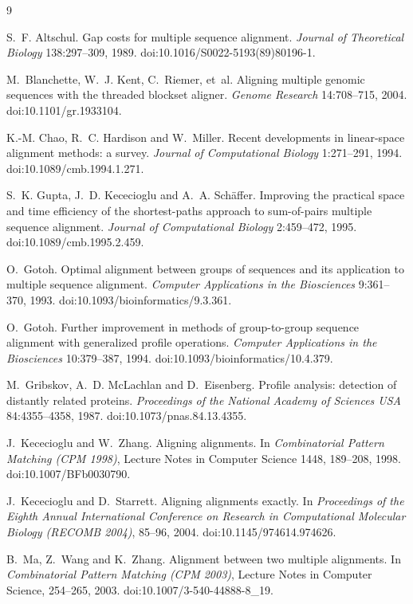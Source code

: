 \documentclass[11pt,letterpaper]{article}
\begin{document}
\begin{thebibliography}{9}

 S.~F. Altschul. Gap costs for multiple sequence alignment. \emph{Journal of Theoretical
Biology} 138:297--309, 1989. doi:10.1016/S0022-5193(89)80196-1.

 M.~Blanchette, W.~J. Kent, C.~Riemer, et~al. Aligning multiple genomic sequences with the
threaded blockset aligner. \emph{Genome Research} 14:708--715, 2004. doi:10.1101/gr.1933104.

 K.-M. Chao, R.~C. Hardison and W.~Miller. Recent developments in linear-space alignment
methods: a survey. \emph{Journal of Computational Biology} 1:271--291, 1994. doi:10.1089/cmb.1994.1.271.

 S.~K. Gupta, J.~D. Kececioglu and A.~A. Sch\"affer. Improving the practical space and time
efficiency of the shortest-paths approach to sum-of-pairs multiple sequence alignment. \emph{Journal of
Computational Biology} 2:459--472, 1995. doi:10.1089/cmb.1995.2.459.

 O.~Gotoh. Optimal alignment between groups of sequences and its application to multiple sequence
alignment. \emph{Computer Applications in the Biosciences} 9:361--370, 1993. doi:10.1093/bioinformatics/9.3.361.

 O.~Gotoh. Further improvement in methods of group-to-group sequence alignment with generalized
profile operations. \emph{Computer Applications in the Biosciences} 10:379--387, 1994.
doi:10.1093/bioinformatics/10.4.379.

 M.~Gribskov, A.~D. McLachlan and D.~Eisenberg. Profile analysis: detection of distantly
related proteins. \emph{Proceedings of the National Academy of Sciences USA} 84:4355--4358, 1987.
doi:10.1073/pnas.84.13.4355.

 J.~Kececioglu and W.~Zhang. Aligning alignments. In \emph{Combinatorial Pattern Matching
(CPM 1998)}, Lecture Notes in Computer Science 1448, 189--208, 1998. doi:10.1007/BFb0030790.

 J.~Kececioglu and D.~Starrett. Aligning alignments exactly. In \emph{Proceedings of the
Eighth Annual International Conference on Research in Computational Molecular Biology (RECOMB 2004)}, 85--96, 2004.
doi:10.1145/974614.974626.

 B.~Ma, Z.~Wang and K.~Zhang. Alignment between two multiple alignments. In \emph{Combinatorial
Pattern Matching (CPM 2003)}, Lecture Notes in Computer Science, 254--265, 2003. doi:10.1007/3-540-44888-8\_19.


\end{thebibliography}
\end{document}
